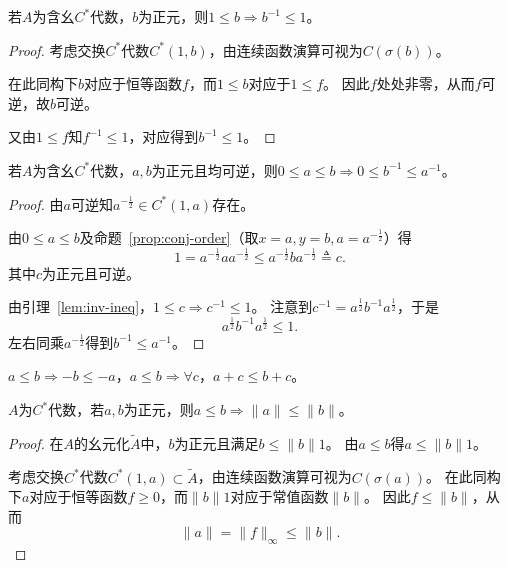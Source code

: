 \documentclass[lang=cn,a4paper,newtx,section]{elegantbook}
\begin{document}
\begin{lemma}\label{lem:inv-ineq}
  若$A$为含幺$C^*$代数，$b$为正元，则$1 \leq b \Rightarrow b^{-1} \leq 1$。
\end{lemma}

\begin{proof}
  考虑交换$C^*$代数$C^*(1, b)$，由连续函数演算可视为$C(\sigma(b))$。
  
  在此同构下$b$对应于恒等函数$f$，而$1 \leq b$对应于$1 \leq f$。
  因此$f$处处非零，从而$f$可逆，故$b$可逆。
  
  又由$1 \leq f$知$f^{-1} \leq 1$，对应得到$b^{-1} \leq 1$。
\end{proof}

\begin{proposition}\label{prop:inv-order}
  若$A$为含幺$C^*$代数，$a, b$为正元且均可逆，则$0 \leq a \leq b \Rightarrow 0 \leq b^{-1} \leq a^{-1}$。
\end{proposition}

\begin{proof}
  由$a$可逆知$a^{-\frac{1}{2}} \in C^*(1, a)$存在。
  
  由$0 \leq a \leq b$及命题~\ref{prop:conj-order}（取$x=a, y=b, a=a^{-\frac{1}{2}}$）得
  \begin{equation*}
    1 = a^{-\frac{1}{2}}aa^{-\frac{1}{2}} \leq a^{-\frac{1}{2}}ba^{-\frac{1}{2}} \triangleq c.
  \end{equation*}
  其中$c$为正元且可逆。
  
  由引理~\ref{lem:inv-ineq}，$1 \leq c \Rightarrow c^{-1} \leq 1$。
  注意到$c^{-1} = a^{\frac{1}{2}}b^{-1}a^{\frac{1}{2}}$，于是
  \begin{equation*}
    a^{\frac{1}{2}}b^{-1}a^{\frac{1}{2}} \leq 1.
  \end{equation*}
  左右同乘$a^{-\frac{1}{2}}$得到$b^{-1} \leq a^{-1}$。
\end{proof}

\begin{remark}
  $a \leq b \Rightarrow -b \leq -a$，$a \leq b \Rightarrow \forall c$，$a + c \leq b + c$。
\end{remark}

\begin{proposition}
  $A$为$C^*$代数，若$a, b$为正元，则$a \leq b \Rightarrow \|a\| \leq \|b\|$。
\end{proposition}

\begin{proof}
  在$A$的幺元化$\tilde{A}$中，$b$为正元且满足$b \leq \|b\|1$。
  由$a \leq b$得$a \leq \|b\|1$。
  
  考虑交换$C^*$代数$C^*(1, a) \subset \tilde{A}$，由连续函数演算可视为$C(\sigma(a))$。
  在此同构下$a$对应于恒等函数$f \geq 0$，而$\|b\|1$对应于常值函数$\|b\|$。
  因此$f \leq \|b\|$，从而
  \begin{equation*}
    \|a\| = \|f\|_{\infty} \leq \|b\|.
  \end{equation*}
\end{proof}
\end{document}
